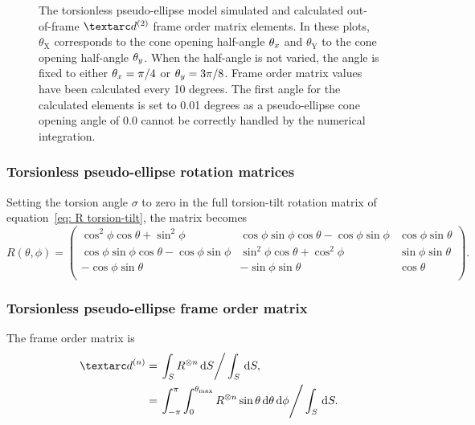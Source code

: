 \begin{figure}
\begin{tabular}{@{}cc@{}}
  \end{tabular}
  \caption[Torsionless pseudo-ellipse simulated and calculated out-of-frame Daeg$^{(2)}$ elements.]{
    The torsionless pseudo-ellipse model simulated and calculated out-of-frame $\FOtwo$ frame order matrix elements.
    In these plots, $\theta_\textrm{X}$ corresponds to the cone opening half-angle $\theta_x$ and $\theta_\textrm{Y}$ to the cone opening half-angle $\theta_y$.
    When the half-angle is not varied, the angle is fixed to either $\theta_x = \pi/4$ or $\theta_y = 3\pi/8$.
    Frame order matrix values have been calculated every 10 degrees.
    The first angle for the calculated elements is set to 0.01 degrees as a pseudo-ellipse cone opening angle of 0.0 cannot be correctly handled by the numerical integration.
  }
  \label{fig: simulated and calculated out-of-frame 2nd degree pseudo-ellipse, torsionless frame order}
\end{figure}


\subsubsection{Torsionless pseudo-ellipse rotation matrices}

Setting the torsion angle $\sigma$ to zero in the full torsion-tilt rotation matrix of equation~\ref{eq: R torsion-tilt}, the matrix becomes
\begin{equation}\label{eq: R torsionless}
    R(\theta, \phi) =
        \begin{pmatrix}
            \cos^2\phi \cos\theta + \sin^2\phi               & \cos\phi \sin\phi \cos\theta - \cos\phi \sin\phi & \cos\phi \sin\theta \\
            \cos\phi \sin\phi \cos\theta - \cos\phi \sin\phi & \sin^2\phi \cos\theta + \cos^2\phi               & \sin\phi \sin\theta \\
            - \cos\phi \sin\theta                            & - \sin\phi \sin\theta                            & \cos\theta \\
        \end{pmatrix}.
\end{equation}



\subsubsection{Torsionless pseudo-ellipse frame order matrix}

The frame order matrix is
\begin{subequations}
\begin{align}
    \FOn &= \left. \int_S R^{\otimes n} \diff S \right / \int_S \diff S, \\
         &= \left. \int_{-\pi}^{\pi} \int_{0}^{\conethetamax} R^{\otimes n} \sin\theta \diff\theta \diff\phi  \right / \int_S \diff S .
\end{align}
\end{subequations}


